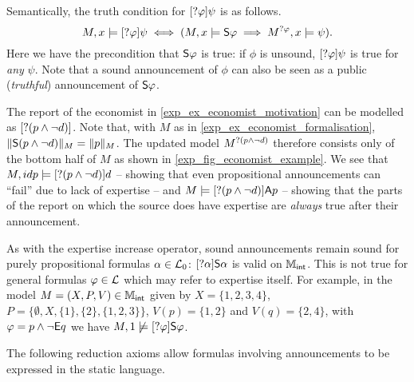 Semantically, the truth condition for $[\sndann\phi]\psi$ is as follows.
\[
M, x \models [\sndann\phi]\psi
    \iff
(M, x \models \S\phi \implies M^{\sndann\phi}, x \models \psi).
\]
Here we have the precondition that $\S\phi$ is true: if $\phi$ is unsound,
$[\sndann\phi]\psi$ is true for \emph{any} $\psi$. Note that a sound
announcement of $\phi$ can also be seen as a public (\emph{truthful})
announcement of $\S\phi$.

\begin{example}
\label{exp_ex_dynamic}

    The report of the economist in \cref{exp_ex_economist_motivation} can be
    modelled as $[\sndann(p \land \neg d)]$. Note that, with $M$ as in
    \cref{exp_ex_economist_formalisation}, $\|\S(p \land \neg d)\|_M = \|p\|_M$.
    The updated model $M^{\sndann(p \land \neg d)}$ therefore consists only of
    the bottom half of $M$ as shown in \cref{exp_fig_economist_example}. We see
    that $M, idp \models [\sndann(p \land \neg d)]d$ -- showing that even
    propositional announcements can ``fail'' due to lack of expertise -- and $M
    \models [\sndann(p \land \neg d)]\A p$ -- showing that the parts of the
    report on which the source does have expertise are \emph{always} true
    after their announcement.

\end{example}

As with the expertise increase operator, sound announcements remain sound for
purely propositional formulas $\alpha \in \cLzero$:
$[\sndann\alpha]\S\alpha$ is valid on $\Mint$. This is
not true for general formulas $\phi \in \cL$ which may refer to expertise
itself. For example, in the model $M = (X, P, V) \in \Mint$ given by
$X = \{1,2,3,4\}$, $P = \{\emptyset, X, \{1\}, \{2\}, \{1, 2,
3\}\}$, $V(p) = \{1, 2\}$ and $V(q) = \{2, 4\}$, with $\phi =
p \land \neg\E q$ we have $M, 1 \not\models [\sndann\phi]\S\phi$.

The following reduction axioms allow formulas involving announcements to be
expressed in the static language.

